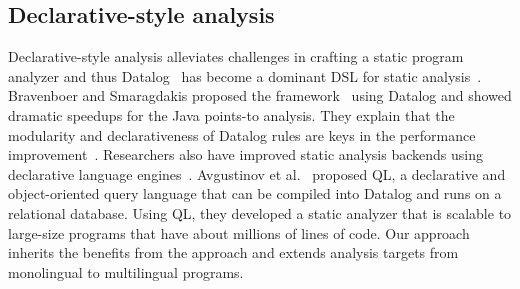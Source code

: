 

\subsection{Declarative-style analysis}
Declarative-style analysis alleviates challenges in crafting a static program
analyzer and thus Datalog~\cite{allen2015D, allen2015stagedD, alpuente2010D,
doop, dawson1996D, naik2006D, reps1994D, smaragdakis2014D, whaley2005D} has
become a dominant DSL for static analysis~\cite{scholz2016}.  Bravenboer and
Smaragdakis proposed the \doop framework~\cite{doop} using Datalog and showed
dramatic speedups for the Java points-to analysis.  They explain that the
modularity and declarativeness of Datalog rules are keys in the performance
improvement~\cite{doopWorkshop}.  Researchers also have improved static
analysis backends using declarative language engines~\cite{whaley2005D,
hoder2011muz, souffle, madsen2016}.  Avgustinov et al.~\cite{ql2016} proposed
QL, a declarative and object-oriented query language that can be compiled into
Datalog and runs on a relational database. Using QL, they developed a static
analyzer that is scalable to large-size programs that have about millions of
lines of code.  Our approach inherits the benefits from the approach and
extends analysis targets from monolingual to multilingual programs.
